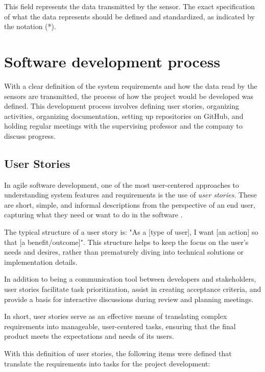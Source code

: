 This field represents the data transmitted by the sensor. The exact specification of what the data represents should be defined and standardized, as indicated by the notation (*).


\section[Software development process]{Software development process}
With a clear definition of the system requirements and how the data read by the sensors are transmitted, the process of how the project would be developed was defined. This development process involves defining user stories, organizing activities, organizing documentation, setting up repositories on GitHub, and holding regular meetings with the supervising professor and the company to discuss progress.

\subsection{User Stories}
In agile software development, one of the most user-centered approaches to understanding system features and requirements is the use of \textit{user stories}. These are short, simple, and informal descriptions from the perspective of an end user, capturing what they need or want to do in the software \cite{lucassen2015forging}.

The typical structure of a user story is: "As a [type of user], I want [an action] so that [a benefit/outcome]". This structure helps to keep the focus on the user's needs and desires, rather than prematurely diving into technical solutions or implementation details.

In addition to being a communication tool between developers and stakeholders, user stories facilitate task prioritization, assist in creating acceptance criteria, and provide a basis for interactive discussions during review and planning meetings.

In short, user stories serve as an effective means of translating complex requirements into manageable, user-centered tasks, ensuring that the final product meets the expectations and needs of its users.

With this definition of user stories, the following items were defined that translate the requirements into tasks for the project development:

